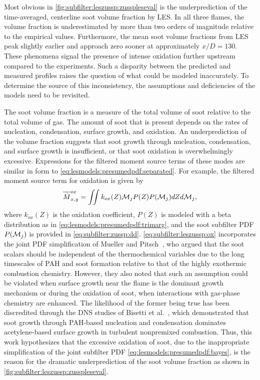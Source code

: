Most obvious in \cref{fig:subfilter:leszussp:zusspleseval} is the underprediction of the time-averaged, centerline soot volume fraction by LES. In all three flames, the volume fraction is underestimated by more than two orders of magnitude relative to the empirical values. Furthermore, the mean soot volume fractions from LES peak slightly earlier and approach zero sooner at approximately $x/D = 130$. These phenomena signal the presence of intense oxidation further upstream compared to the experiments. Such a disparity between the predicted and measured profiles raises the question of what could be modeled inaccurately. To determine the source of this inconsistency, the assumptions and deficiencies of the models need to be revisited.

The soot volume fraction is a measure of the total volume of soot relative to the total volume of gas. The amount of soot that is present depends on the rates of nucleation, condensation, surface growth, and oxidation. An underprediction of the volume fraction suggests that soot growth through nucleation, condensation, and surface growth is insufficient, or that soot oxidation is overwhelmingly excessive. Expressions for the filtered moment source terms of these modes are similar in form to \cref{eq:lesmodels:presumedpdf:separated}. For example, the filtered moment source term for oxidation is given by
\begin{equation}\label{eq:subfilter:leszussp:ox}
  \overline{\dot{M}}_{x,y}^{ox} = \iint k_{ox}(Z)\mathcal{M}_jP(Z)P(\mathcal{M}_j) dZ d\mathcal{M}_j,
\end{equation}
where $k_{ox}(Z)$ is the oxidation coefficient, $P(Z)$ is modeled with a beta distribution as in \cref{eq:lesmodels:presumedpdf:trimarg}, and the soot subfilter PDF $P(\mathcal{M}_j)$ is provided in \cref{eq:subfilter:zussp:dd}. \cref{eq:subfilter:leszussp:ox} incorporates the joint PDF simplification of Mueller and Pitsch~\cite{subfilterpdf2011}, who argued that the soot scalars should be independent of the thermochemical variables due to the long timescales of PAH and soot formation relative to that of the highly exothermic combustion chemistry. However, they also noted that such an assumption could be violated when surface growth near the flame is the dominant growth mechanism or during the oxidation of soot, when interactions with gas-phase chemistry are enhanced. The likelihood of the former being true has been discredited through the DNS studies of Bisetti et al.~\cite{bisetti2012}, which demonstrated that soot growth through PAH-based nucleation and condensation dominates acetylene-based surface growth in turbulent nonpremixed combustion. Thus, this work hypothesizes that the excessive oxidation of soot, due to the inappropriate simplification of the joint subfilter PDF \cref{eq:lesmodels:presumedpdf:bayes}, is the reason for the dramatic underprediction of the soot volume fraction as shown in \cref{fig:subfilter:leszussp:zusspleseval}.

